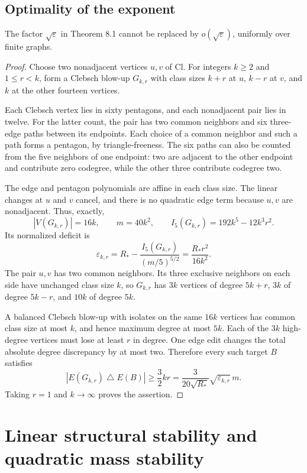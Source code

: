 \subsection{Optimality of the exponent}

\begin{proposition}\label{prop:sqrt-optimality}
The factor $\sqrt\varepsilon$ in Theorem 8.1 cannot be replaced by
$o(\sqrt\varepsilon)$, uniformly over finite graphs.
\end{proposition}

\begin{proof}
Choose two nonadjacent vertices $u,v$ of $\mathrm{Cl}$. For integers
$k\geq2$ and $1\leq r<k$, form a Clebsch blow-up $G_{k,r}$ with class sizes
$k+r$ at $u$, $k-r$ at $v$, and $k$ at the other fourteen vertices.

Each Clebsch vertex lies in sixty pentagons, and each nonadjacent pair lies
in twelve. For the latter count, the pair has two common neighbors and six
three-edge paths between its endpoints. Each choice of a common neighbor
and such a path forms a pentagon, by triangle-freeness. The six paths can
also be counted from the five neighbors of one endpoint: two are adjacent
to the other endpoint and contribute zero codegree, while the other three
contribute codegree two.

The edge and pentagon polynomials are affine in each class size. The linear
changes at $u$ and $v$ cancel, and there is no quadratic edge term because
$u,v$ are nonadjacent. Thus, exactly,
\[
 |V(G_{k,r})|=16k,\qquad m=40k^2,\qquad
 I_5(G_{k,r})=192k^5-12k^3r^2.
\]
Its normalized deficit is
\[
 \varepsilon_{k,r}=R_\ast-\frac{I_5(G_{k,r})}{(m/5)^{5/2}}
 =\frac{R_\ast r^2}{16k^2}.
\]
The pair $u,v$ has two common neighbors. Its three exclusive neighbors on
each side have unchanged class size $k$, so $G_{k,r}$ has $3k$ vertices of
degree $5k+r$, $3k$ of degree $5k-r$, and $10k$ of degree $5k$.

A balanced Clebsch blow-up with isolates on the same $16k$ vertices has
common class size at most $k$, and hence maximum degree at most $5k$.
Each of the $3k$ high-degree vertices must lose at least $r$ in degree. One
edge edit changes the total absolute degree discrepancy by at most two.
Therefore every such target $B$ satisfies
\[
 |E(G_{k,r})\mathbin{\triangle}E(B)|\geq\frac32kr
 =\frac3{20\sqrt{R_\ast}}\sqrt{\varepsilon_{k,r}}\,m.
\]
Taking $r=1$ and $k\to\infty$ proves the assertion.
\end{proof}

\section{Linear structural stability and quadratic mass stability}
\label{sec:linear-stability}

